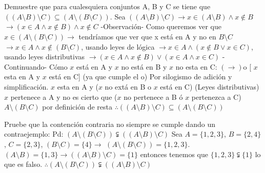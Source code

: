 \section{}
Demuestre que para cualesquiera conjuntos A, B y C se tiene que \newline
$((A \setminus B) \setminus C) \subseteq (A \setminus (B \setminus C))$.\newline
Sea $((A \setminus B) \setminus C) \rightarrow x \in (A \setminus B) \wedge x \notin B$ \newline
$ \rightarrow (x \in A \wedge x \notin B) \wedge x \notin C$ \newline
-Observación-\newline
Como queremos ver que $x \in (A \setminus (B \setminus C)) \rightarrow$ tendríamos que ver que x está en A y no en $B \setminus C$\newline 
$\rightarrow x \in A \wedge x \notin (B \setminus C)$, usando leyes de lógica\newline
$\rightarrow x \in A \wedge (x \notin B \lor x \in C)$, usando leyes distributivas\newline
$\rightarrow (x \in A \wedge x \notin B) \lor (x \in A \wedge x \in C)$\newline
-Continuando-\newline
Cómo $x$ está en A y $x$ no está en B y $x$ no esta en C:\newline
$(\rightarrow)$ o [ $x$ esta en A y $x$ está en C] (ya que cumple el o) Por silogismo de adición y simplificación.\newline
$x$ esta en A y ($x$ no extá en B o $x$ está en C) (Leyes distributivas)\newline
$x$ pertenece a A y no es cierto que ($x$ no pertenece a B ó $x$ pertenezca a C)\newline
$A \setminus (B \setminus C)$ por definición de resta\newline
$\therefore ((A \setminus B)\setminus C) \subseteq (A \setminus (B \setminus C))$\newline

Pruebe que la contención contraria no siempre se cumple dando un contraejemplo:\newline
Pd: $(A \setminus (B \setminus C)) \subsetneqq ((A \setminus B) \setminus C)$\newline
Sea $A = \{ 1, 2, 3\}$, $B = \{2,4\}$, $C = \{ 2,3\}$, $(B \setminus C) = \{ 4\} \rightarrow$\newline
$(A \setminus (B \setminus C)) = \{1,2,3\}$. $(A \setminus B)= \{1,3\} \rightarrow ((A \setminus B) \setminus C) = \{1\}$
entonces tenemos que $ \{1,2,3 \} \subsetneqq \{ 1\}$ lo que es falso.\newline
$\therefore (A \setminus (B \setminus C)) \subsetneqq ((A \setminus B) \setminus C)$